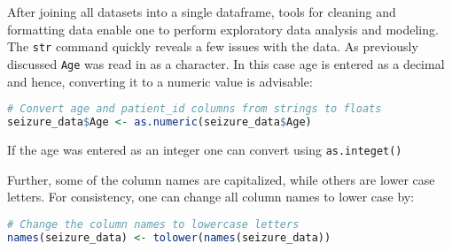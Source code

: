 After joining all datasets into a single dataframe, tools for cleaning and formatting data enable one to perform exploratory data analysis and modeling. The \verb|str| command quickly reveals a few issues with the data. As previously discussed \verb|Age| was read in as a character. In this case age is entered as a decimal and hence, converting it to a numeric value is advisable:
\begin{lstlisting}[language=R]
# Convert age and patient_id columns from strings to floats
seizure_data$Age <- as.numeric(seizure_data$Age)
\end{lstlisting}
If the age was entered as an integer one can convert using \verb|as.integet()|

Further, some of the column names are capitalized, while others are lower case letters. For consistency, one can change all column names to lower case by:
\begin{lstlisting}[language=R]
# Change the column names to lowercase letters
names(seizure_data) <- tolower(names(seizure_data))
\end{lstlisting}

